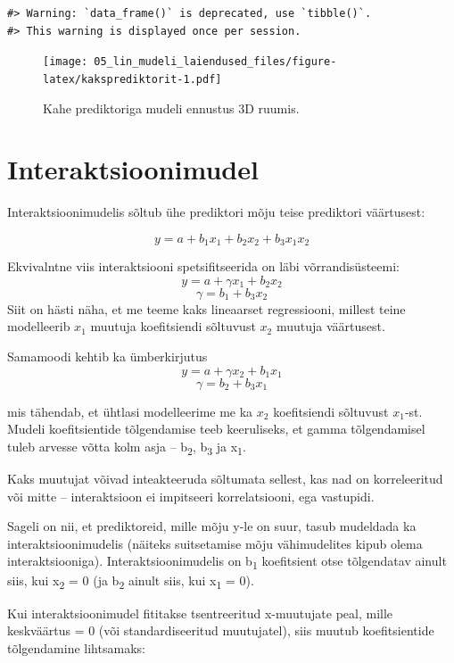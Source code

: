 \documentclass[]{book}
\begin{document}
\begin{verbatim}
#> Warning: `data_frame()` is deprecated, use `tibble()`.
#> This warning is displayed once per session.
\end{verbatim}

\begin{figure}
\centering
\texttt{[image: 05\_lin\_mudeli\_laiendused\_files/figure-latex/kaksprediktorit-1.pdf]}
\caption{\label{fig:kaksprediktorit}Kahe prediktoriga mudeli ennustus 3D ruumis.}
\end{figure}

\hypertarget{interaktsioonimudel}{%
\section{Interaktsioonimudel}\label{interaktsioonimudel}}

Interaktsioonimudelis sõltub ühe prediktori mõju teise prediktori väärtusest:

\[y = a + b_1x_1 + b_2x_2 + b_3x_1x_2\]

Ekvivalntne viis interaktsiooni spetsifitseerida on läbi võrrandisüsteemi:
\[y = a + \gamma x_1 + b_2x_2\]
\[\gamma = b_1 + b_3x_2\]
Siit on hästi näha, et me teeme kaks lineaarset regressiooni, millest teine modelleerib \(x_1\) muutuja koefitsiendi sõltuvust \(x_2\) muutuja väärtusest.

Samamoodi kehtib ka ümberkirjutus
\[y = a + \gamma x_2 + b_1x_1\]
\[\gamma = b_2 + b_3x_1\]

mis tähendab, et ühtlasi modelleerime me ka \(x_2\) koefitsiendi sõltuvust \(x_1\)-st. Mudeli koefitsientide tõlgendamise teeb keeruliseks, et gamma tõlgendamisel tuleb arvesse võtta kolm asja -- b\textsubscript{2}, b\textsubscript{3} ja x\textsubscript{1}.

Kaks muutujat võivad inteakteeruda sõltumata sellest, kas nad on korreleeritud või mitte -- interaktsioon ei impitseeri korrelatsiooni, ega vastupidi.

Sageli on nii, et prediktoreid, mille mõju y-le on suur, tasub mudeldada ka interaktsioonimudelis (näiteks suitsetamise mõju vähimudelites kipub olema interaktsiooniga).
Interaktsioonimudelis on b\textsubscript{1} koefitsient otse tõlgendatav ainult siis, kui x\textsubscript{2} = 0 (ja b\textsubscript{2} ainult siis, kui x\textsubscript{1} = 0).

Kui interaktsioonimudel fititakse tsentreeritud x-muutujate peal, mille keskväärtus = 0 (või standardiseeritud muutujatel), siis muutub koefitsientide tõlgendamine lihtsamaks:
\end{document}
